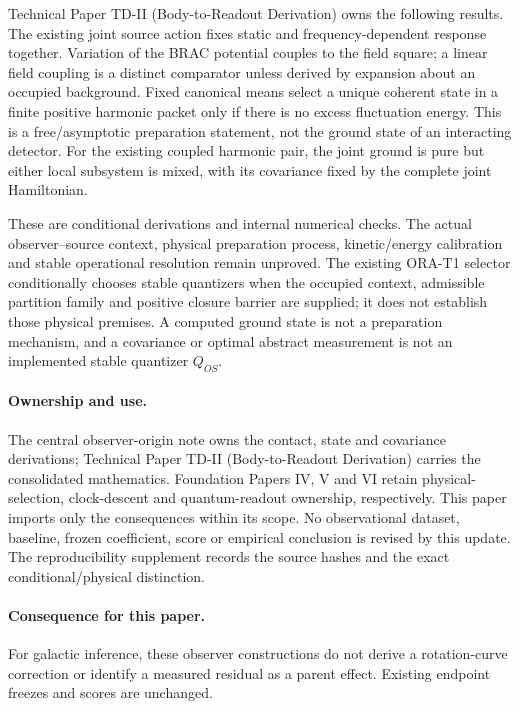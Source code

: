 \documentclass[11pt]{article}
\begin{document}
Technical Paper TD-II (Body-to-Readout Derivation) owns the following
results. The existing joint source action fixes static and frequency-dependent
response together. Variation of the BRAC potential couples to the field
square; a linear field coupling is a distinct comparator unless derived by
expansion about an occupied background. Fixed canonical means select a unique
coherent state in a finite positive harmonic packet only if there is no excess
fluctuation energy. This is a free/asymptotic preparation statement, not the
ground state of an interacting detector. For the existing coupled harmonic
pair, the joint ground is pure but either local subsystem is mixed, with its
covariance fixed by the complete joint Hamiltonian.

These are conditional derivations and internal numerical checks. The actual
observer--source context, physical preparation process, kinetic/energy
calibration and stable operational resolution remain unproved. The existing
ORA-T1 selector conditionally chooses stable quantizers when the occupied
context, admissible partition family and positive closure barrier are supplied;
it does not establish those physical premises. A computed ground state is not
a preparation mechanism, and a covariance or optimal abstract measurement is
not an implemented stable quantizer $Q_{OS}$.

\paragraph{Ownership and use.}
The central observer-origin note owns the contact, state and covariance
derivations; Technical Paper TD-II (Body-to-Readout Derivation) carries the consolidated
mathematics. Foundation Papers IV, V and VI retain physical-selection,
clock-descent and quantum-readout ownership, respectively. This paper imports
only the consequences within its scope. No observational dataset, baseline,
frozen coefficient, score or empirical conclusion is revised by this update.
The reproducibility supplement records the source hashes and the exact
conditional/physical distinction.

\paragraph{Consequence for this paper.}
For galactic inference, these observer constructions do not derive a rotation-curve correction or identify a measured residual as a parent effect. Existing endpoint freezes and scores are unchanged.
\end{document}
